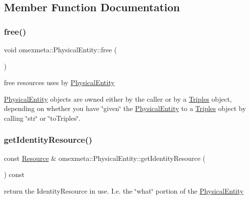 \subsection{Member Function Documentation}
\mbox{\label{classomexmeta_1_1PhysicalEntity_a6fd4acd7255a01322c4a53d3e84df0ba}} 
\subsubsection{\texorpdfstring{free()}{free()}}
{\footnotesize\ttfamily void omexmeta\+::\+Physical\+Entity\+::free (\begin{DoxyParamCaption}{ }\end{DoxyParamCaption})}



free resources uses by \hyperlink{classomexmeta_1_1PhysicalEntity}{Physical\+Entity} 

\hyperlink{classomexmeta_1_1PhysicalEntity}{Physical\+Entity} objects are owned either by the caller or by a \hyperlink{classomexmeta_1_1Triples}{Triples} object, depending on whether you have \char`\"{}given\char`\"{} the \hyperlink{classomexmeta_1_1PhysicalEntity}{Physical\+Entity} to a \hyperlink{classomexmeta_1_1Triples}{Triples} object by calling \char`\"{}str\char`\"{} or \char`\"{}to\+Triples\char`\"{}. \mbox{\label{classomexmeta_1_1PhysicalEntity_ae4b3374e9ebb817eb63f9105b491e958}} 
\subsubsection{\texorpdfstring{get\+Identity\+Resource()}{getIdentityResource()}}
{\footnotesize\ttfamily const \hyperlink{classomexmeta_1_1Resource}{Resource} \& omexmeta\+::\+Physical\+Entity\+::get\+Identity\+Resource (\begin{DoxyParamCaption}{ }\end{DoxyParamCaption}) const}



return the Identity\+Resource in use. I.\+e. the \char`\"{}what\char`\"{} portion of the \hyperlink{classomexmeta_1_1PhysicalEntity}{Physical\+Entity} 


